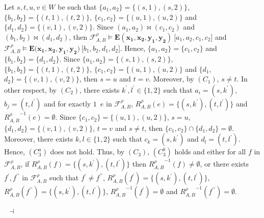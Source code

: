 \documentclass[draft]{article}
\newenvironment{proof}{{\bf Proof:}}{~$\dashv$\\}
\begin{document}
\begin{proof}
Let $s,t,u,v{\in}W$ be such that $\{a_{1},a_{2}\}{=}\{(s,1),(s,2)\}$, $\{b_{1},b_{2}\}{=}\{(t,1),(t,2)\}$, $\{c_{1},c_{2}\}{=}\{(u,1),(u,2)\}$ and $\{d_{1},d_{2}\}{=}\{(v,1),(v,2)\}$.
Since $(a_{1},a_{2}){\bowtie}(c_{1},c_{2})$ and $(b_{1},b_{2}){\bowtie}(d_{1},d_{2})$, then ${\mathcal F}^{\rho}_{A,B}{\models}\mathbf{E}(\mathbf{x_{1}},\mathbf{x_{2}},\mathbf{y_{1}},\mathbf{y_{2}})\ \lbrack a_{1},a_{2},c_{1},c_{2}\rbrack$ and ${\mathcal F}^{\rho}_{A,B}{\models}\mathbf{E}(\mathbf{x_{1}},
%
%
%
%
%
%
%
%
%
%
%
%
$\linebreak$
%
%
%
%
%
%
%
%
%
%
%
%
\mathbf{x_{2}},\mathbf{y_{1}},\mathbf{y_{2}})\ \lbrack b_{1},b_{2},d_{1},d_{2}\rbrack$.
Hence, %
$\{a_{1},a_{2}\}{=}\{c_{1},c_{2}\}$ and $\{b_{1},b_{2}\}{=}\{d_{1},d_{2}\}$.
Since $\{a_{1},a_{2}\}{=}\{(s,1),(s,2)\}$, $\{b_{1},b_{2}\}{=}\{(t,1),(t,2)\}$, $\{c_{1},c_{2}\}{=}\{(u,1),(u,2)\}$ and $\{d_{1},
%
%
%
%
%
%
%
%
%
%
%
%
$\linebreak$
%
%
%
%
%
%
%
%
%
%
%
%
d_{2}\}{=}\{(v,1),(v,2)\}$, then $s{=}u$ and $t{=}v$.
Moreover, by $(C_{1})$, $s{\not=}t$.
In other respect, by $(C_{2})$, there exists $k^{\prime},l^{\prime}{\in}\{1,2\}$ such that $a_{i}{=}(s,k^{\prime})$, $b_{j}{=}(t,l^{\prime})$ and for exactly $1$~$e$ in ${\mathcal F}_{A,B}^{\rho}$, $R_{A,B}^{\rho}(e){=}\{(s,k^{\prime}),(t,l^{\prime})\}$ and ${R_{A,B}^{\rho}}^{{-}1}(e){=}\emptyset$.
Since $\{c_{1},c_{2}\}{=}\{(u,1),(u,2)\}$, $s{=}u$, $\{d_{1},d_{2}\}{=}\{(v,1),(v,2)\}$, $t{=}v$ and $s{\not=}t$, then $\{c_{1},
%
%
%
%
%
%
%
%
%
%
%
%
$\linebreak$
%
%
%
%
%
%
%
%
%
%
%
%
c_{2}\}{\cap}\{d_{1},d_{2}\}{=}\emptyset$.
Moreover, there exists $k,l{\in}\{1,2\}$ such that $c_{k}{=}(s,k^{\prime})$ and $d_{l}{=}(t,l^{\prime})$.
Hence, $(C_{3}^{a})$ does not hold.
Thus, by $(C_{3})$, $(C_{3}^{b})$ holds and either for all $f$ in ${\mathcal F}_{A,B}^{\rho}$, if $R_{A,B}^{\rho}(f){=}\{(s,k^{\prime}),(t,l^{\prime})\}$ then ${R_{A,B}^{\rho}}^{{-}1}(f){\not=}\emptyset$, or there exists $f^{\prime},f^{\prime\prime}$ in ${\mathcal F}_{A,B}^{\rho}$ such that $f^{\prime}{\not=}f^{\prime\prime}$, $R_{A,B}^{\rho}(f^{\prime}){=}\{(s,k^{\prime}),(t,l^{\prime})\}$, $R_{A,B}^{\rho}(f^{\prime\prime}){=}\{(s,k^{\prime}),(t,l^{\prime})\}$, ${R_{A,B}^{\rho}}^{{-}1}(f^{\prime}){=}\emptyset$ and ${R_{A,B}^{\rho}}^{{-}1}(f^{\prime\prime}){=}\emptyset$.

\end{proof}
\end{document}

